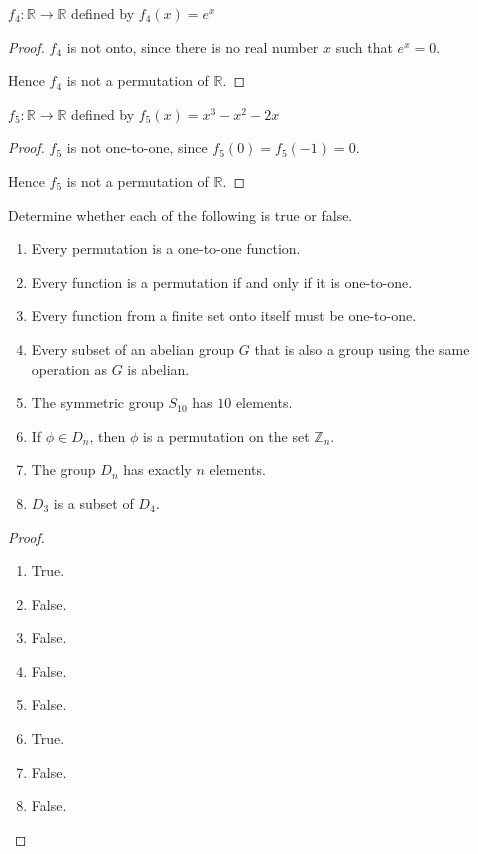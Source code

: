 \begin{exercise}
    $f_{4}: \mathbb{R} \to \mathbb{R}$ defined by $f_{4}(x) = e^{x}$
\end{exercise}

\begin{proof}
    $f_{4}$ is not onto, since there is no real number $x$ such that $e^{x} = 0$.

    Hence $f_{4}$ is not a permutation of $\mathbb{R}$.
\end{proof}

\begin{exercise}
    $f_{5}: \mathbb{R} \to \mathbb{R}$ defined by $f_{5}(x) = x^{3} - x^{2} - 2x$
\end{exercise}

\begin{proof}
    $f_{5}$ is not one-to-one, since $f_{5}(0) = f_{5}(-1) = 0$.

    Hence $f_{5}$ is not a permutation of $\mathbb{R}$.
\end{proof}

\begin{exercise}
    Determine whether each of the following is true or false.
    \begin{enumerate}[label={\textbf{\alph*.}}]
        \item Every permutation is a one-to-one function.
        \item Every function is a permutation if and only if it is one-to-one.
        \item Every function from a finite set onto itself must be one-to-one.
        \item Every subset of an abelian group $G$ that is also a group using the same operation as $G$ is abelian.
        \item The symmetric group $S_{10}$ has $10$ elements.
        \item If $\phi\in D_{n}$, then $\phi$ is a permutation on the set $\mathbb{Z}_{n}$.
        \item The group $D_{n}$ has exactly $n$ elements.
        \item $D_{3}$ is a subset of $D_{4}$.
    \end{enumerate}
\end{exercise}

\begin{proof}
    \begin{enumerate}[label={\textbf{\alph*.}}]
        \item True.
        \item False.
        \item False.
        \item False.
        \item False.
        \item True.
        \item False.
        \item False.
    \end{enumerate}
\end{proof}

